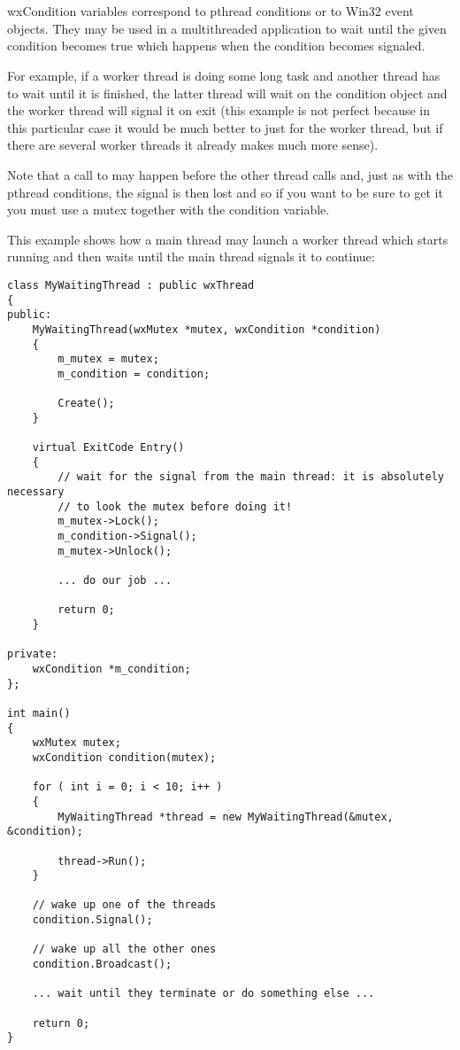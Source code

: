 \section{}\label{wxcondition}

wxCondition variables correspond to pthread conditions or to Win32 event
objects. They may be used in a multithreaded application to wait until the
given condition becomes true which happens when the condition becomes signaled.

For example, if a worker thread is doing some long task and another thread has
to wait until it is finished, the latter thread will wait on the condition
object and the worker thread will signal it on exit (this example is not
perfect because in this particular case it would be much better to just 
 for the worker thread, but if there are several
worker threads it already makes much more sense).

Note that a call to  may happen before the
other thread calls  and, just as with the
pthread conditions, the signal is then lost and so if you want to be sure to
get it you must use a mutex together with the condition variable.


This example shows how a main thread may launch a worker thread which starts
running and then waits until the main thread signals it to continue:

\begin{verbatim}
class MyWaitingThread : public wxThread
{
public:
    MyWaitingThread(wxMutex *mutex, wxCondition *condition)
    {
        m_mutex = mutex;
        m_condition = condition;

        Create();
    }

    virtual ExitCode Entry()
    {
        // wait for the signal from the main thread: it is absolutely necessary
        // to look the mutex before doing it!
        m_mutex->Lock();
        m_condition->Signal();
        m_mutex->Unlock();

        ... do our job ...

        return 0;
    }

private:
    wxCondition *m_condition;
};

int main()
{
    wxMutex mutex;
    wxCondition condition(mutex);

    for ( int i = 0; i < 10; i++ )
    {
        MyWaitingThread *thread = new MyWaitingThread(&mutex, &condition);

        thread->Run();
    }

    // wake up one of the threads
    condition.Signal();

    // wake up all the other ones
    condition.Broadcast();

    ... wait until they terminate or do something else ...

    return 0;
}
\end{verbatim}

